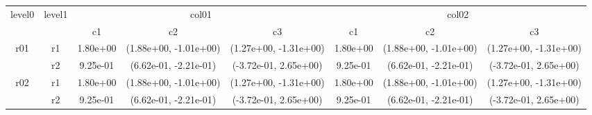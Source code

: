 \begin{tabular}{cccccccc}
\toprule
\multirow{2}{*}{level0} & \multirow{2}{*}{level1}&\multicolumn{3}{c}{col01}&\multicolumn{3}{c}{col02}\tabularnewline
\cmidrule(lr){3-5}
\cmidrule(lr){6-8}
&&c1&c2&c3&c1&c2&c3\tabularnewline
\midrule
\midrule
\multirow{2}{*}{r01}&r1&1.80e+00& (1.88e+00, -1.01e+00)& (1.27e+00, -1.31e+00)&1.80e+00& (1.88e+00, -1.01e+00)& (1.27e+00, -1.31e+00)\tabularnewline
&r2&9.25e-01& (6.62e-01, -2.21e-01)& (-3.72e-01, 2.65e+00)&9.25e-01& (6.62e-01, -2.21e-01)& (-3.72e-01, 2.65e+00)\tabularnewline
\midrule
\multirow{2}{*}{r02}&r1&1.80e+00& (1.88e+00, -1.01e+00)& (1.27e+00, -1.31e+00)&1.80e+00& (1.88e+00, -1.01e+00)& (1.27e+00, -1.31e+00)\tabularnewline
&r2&9.25e-01& (6.62e-01, -2.21e-01)& (-3.72e-01, 2.65e+00)&9.25e-01& (6.62e-01, -2.21e-01)& (-3.72e-01, 2.65e+00)\tabularnewline
\bottomrule
\end{tabular}
